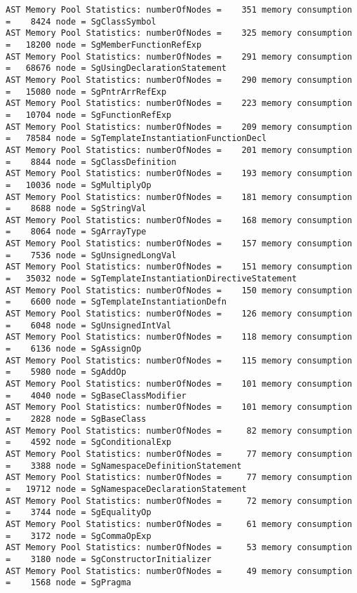 {\begin{verbatim}
AST Memory Pool Statistics: numberOfNodes =    351 memory consumption =    8424 node = SgClassSymbol
AST Memory Pool Statistics: numberOfNodes =    325 memory consumption =   18200 node = SgMemberFunctionRefExp
AST Memory Pool Statistics: numberOfNodes =    291 memory consumption =   68676 node = SgUsingDeclarationStatement
AST Memory Pool Statistics: numberOfNodes =    290 memory consumption =   15080 node = SgPntrArrRefExp
AST Memory Pool Statistics: numberOfNodes =    223 memory consumption =   10704 node = SgFunctionRefExp
AST Memory Pool Statistics: numberOfNodes =    209 memory consumption =   78584 node = SgTemplateInstantiationFunctionDecl
AST Memory Pool Statistics: numberOfNodes =    201 memory consumption =    8844 node = SgClassDefinition
AST Memory Pool Statistics: numberOfNodes =    193 memory consumption =   10036 node = SgMultiplyOp
AST Memory Pool Statistics: numberOfNodes =    181 memory consumption =    8688 node = SgStringVal
AST Memory Pool Statistics: numberOfNodes =    168 memory consumption =    8064 node = SgArrayType
AST Memory Pool Statistics: numberOfNodes =    157 memory consumption =    7536 node = SgUnsignedLongVal
AST Memory Pool Statistics: numberOfNodes =    151 memory consumption =   35032 node = SgTemplateInstantiationDirectiveStatement
AST Memory Pool Statistics: numberOfNodes =    150 memory consumption =    6600 node = SgTemplateInstantiationDefn
AST Memory Pool Statistics: numberOfNodes =    126 memory consumption =    6048 node = SgUnsignedIntVal
AST Memory Pool Statistics: numberOfNodes =    118 memory consumption =    6136 node = SgAssignOp
AST Memory Pool Statistics: numberOfNodes =    115 memory consumption =    5980 node = SgAddOp
AST Memory Pool Statistics: numberOfNodes =    101 memory consumption =    4040 node = SgBaseClassModifier
AST Memory Pool Statistics: numberOfNodes =    101 memory consumption =    2828 node = SgBaseClass
AST Memory Pool Statistics: numberOfNodes =     82 memory consumption =    4592 node = SgConditionalExp
AST Memory Pool Statistics: numberOfNodes =     77 memory consumption =    3388 node = SgNamespaceDefinitionStatement
AST Memory Pool Statistics: numberOfNodes =     77 memory consumption =   19712 node = SgNamespaceDeclarationStatement
AST Memory Pool Statistics: numberOfNodes =     72 memory consumption =    3744 node = SgEqualityOp
AST Memory Pool Statistics: numberOfNodes =     61 memory consumption =    3172 node = SgCommaOpExp
AST Memory Pool Statistics: numberOfNodes =     53 memory consumption =    3180 node = SgConstructorInitializer
AST Memory Pool Statistics: numberOfNodes =     49 memory consumption =    1568 node = SgPragma

\end{verbatim}}
